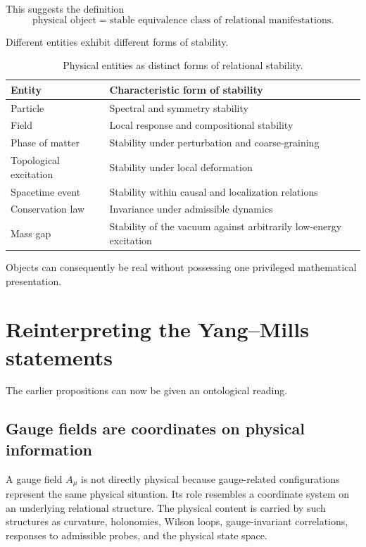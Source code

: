 \documentclass[11pt]{article}
\begin{document}
This suggests the definition
\begin{equation}
  \boxed{
  \text{physical object}
  =
  \text{stable equivalence class of relational manifestations}.}
  \label{eq:object-definition}
\end{equation}

Different entities exhibit different forms of stability.

\begin{table}[ht]
\centering
\small
\renewcommand{\arraystretch}{1.2}
\begin{tabularx}{0.92\textwidth}{>{\raggedright\arraybackslash}p{}X}
\toprule
\textbf{Entity} & \textbf{Characteristic form of stability} \\
\midrule
Particle & Spectral and symmetry stability \\
Field & Local response and compositional stability \\
Phase of matter & Stability under perturbation and coarse-graining \\
Topological excitation & Stability under local deformation \\
Spacetime event & Stability within causal and localization relations \\
Conservation law & Invariance under admissible dynamics \\
Mass gap & Stability of the vacuum against arbitrarily low-energy excitation \\
\bottomrule
\end{tabularx}
\caption{Physical entities as distinct forms of relational stability.}
\label{tab:stabilities}
\end{table}

Objects can consequently be real without possessing one privileged
mathematical presentation.

\section{Reinterpreting the Yang--Mills statements}

The earlier propositions can now be given an ontological reading.

\subsection{Gauge fields are coordinates on physical information}

A gauge field $A_\mu$ is not directly physical because gauge-related
configurations represent the same physical situation.  Its role resembles a
coordinate system on an underlying relational structure.  The physical content
is carried by such structures as curvature, holonomies, Wilson loops,
gauge-invariant correlations, responses to admissible probes, and the physical
state space.
\end{document}
